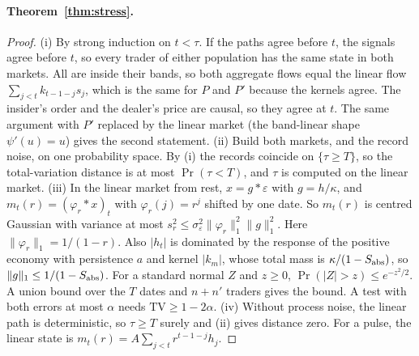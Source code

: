 \documentclass[12pt]{article}
\theoremstyle{definition}
\theoremstyle{remark}
\begin{document}
\paragraph{Theorem~\ref{thm:stress}.}
\begin{proof}
(i) By strong induction on $t<\tau$. If the paths agree before $t$, the signals agree before $t$, so every trader of either population has the same state in both markets. All are inside their bands, so both aggregate flows equal the linear flow $\sum_{j<t}k_{t-1-j}s_j$, which is the same for $P$ and $P'$ because the kernels agree. The insider's order and the dealer's price are causal, so they agree at $t$. The same argument with $P'$ replaced by the linear market (the band-linear shape $\psi'(u)=u$) gives the second statement.
(ii) Build both markets, and the record noise, on one probability space. By (i) the records coincide on $\{\tau\ge T\}$, so the total-variation distance is at most $\Pr(\tau<T)$, and $\tau$ is computed on the linear market.
(iii) In the linear market from rest, $x=g*\varepsilon$ with $g=h/\kappa$, and $m_t(r)=(\varphi_r*x)_t$ with $\varphi_r(j)=r^{j}$ shifted by one date. So $m_t(r)$ is centred Gaussian with variance at most $s_r^2\le\sigma_\varepsilon^2\|\varphi_r\|_1^2\|g\|_1^2$. Here $\|\varphi_r\|_1=1/(1-r)$. Also $|h_t|$ is dominated by the response of the positive economy with persistence $a$ and kernel $|k_m|$, whose total mass is $\kappa/(1-S_{\rm abs})$, so $\|g\|_1\le1/(1-S_{\rm abs})$. For a standard normal $Z$ and $z\ge0$, $\Pr(|Z|>z)\le e^{-z^2/2}$. A union bound over the $T$ dates and $n+n'$ traders gives the bound. A test with both errors at most $\alpha$ needs $\mathrm{TV}\ge1-2\alpha$.
(iv) Without process noise, the linear path is deterministic, so $\tau\ge T$ surely and (ii) gives distance zero. For a pulse, the linear state is $m_t(r)=A\sum_{j<t}r^{t-1-j}h_j$.
\end{proof}
\end{document}
